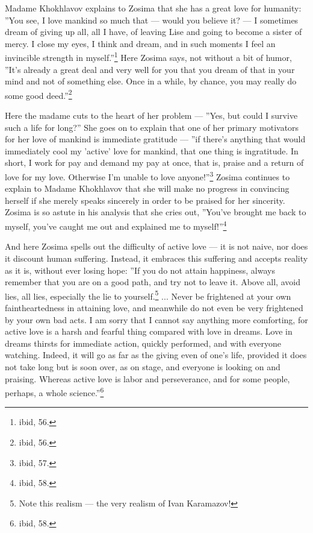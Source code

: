 Madame Khokhlavov explains to Zosima that she has a great love for humanity: ''You see, I love mankind so much that --- would you believe it? --- I sometimes dream of giving up all, all I have, of leaving Lise and going to become a sister of mercy. I close my eyes, I think and dream, and in such moments I feel an invincible strength in myself.''\footnote{ibid, 56.} Here Zosima says, not without a bit of humor, ''It's already a great deal and very well for you that you dream of that in your mind and not of something else. Once in a while, by chance, you may really do some good deed.''\footnote{ibid, 56.}

Here the madame cuts to the heart of her problem --- ''Yes, but could I survive such a life for long?'' She goes on to explain that one of her primary motivators for her love of mankind is immediate gratitude --- ''if there's anything that would immediately cool my 'active' love for mankind, that one thing is ingratitude. In short, I work for pay and demand my pay at once, that is, praise and a return of love for my love. Otherwise I'm unable to love anyone!''\footnote{ibid, 57.} Zosima continues to explain to Madame Khokhlavov that she will make no progress in convincing herself if she merely speaks sincerely in order to be praised for her sincerity. Zosima is so astute in his analysis that she cries out, ''You've brought me back to myself, you've caught me out and explained me to myself!''\footnote{ibid, 58.}

And here Zosima spells out the difficulty of active love --- it is not naive, nor does it discount human suffering. Instead, it embraces this suffering and accepts reality as it is, without ever losing hope: 
''If you do not attain happiness, always remember that you are on a good path, and try not to leave it. Above all, avoid lies, all lies, especially the lie to yourself.\footnote{Note this realism --- the very realism of Ivan Karamazov!} ... Never be frightened at your own faintheartedness in attaining love, and meanwhile do not even be very frightened by your own bad acts. I am sorry that I cannot say anything more comforting, for active love is a harsh and fearful thing compared with love in dreams. Love in dreams thirsts for immediate action, quickly performed, and with everyone watching. Indeed, it will go as far as the giving even of one's life, provided it does not take long but is soon over, as on stage, and everyone is looking on and praising. Whereas active love is labor and perseverance, and for some people, perhaps, a whole science.''\footnote{ibid, 58.}
 
